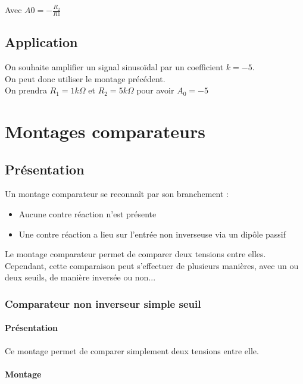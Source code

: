 Avec $A0= -\frac{R_2}{R1}$

\section{Application}

\begin{exemple}
On souhaite amplifier un signal sinusoïdal par un coefficient $k=-5$.\\
On peut donc utiliser le montage précédent. \\
On prendra $R_1=1 k\Omega$ et $R_2=5k\Omega$ pour avoir $A_0=-5$

\end{exemple}


\chapter{Montages comparateurs}
\section{Présentation}

Un montage comparateur se reconnaît par son branchement : 

\begin{itemize}
  \item {\color{red}Aucune contre réaction} n’est présente
  \item Une {\color{red} contre réaction a lieu sur l’entrée non inverseuse} via un dipôle passif
\end{itemize}

Le montage comparateur permet de comparer deux tensions entre elles. \\
Cependant, cette comparaison peut s’effectuer de plusieurs manières, avec un ou deux seuils, de manière inversée ou non...

\subsection{Comparateur non inverseur simple seuil}

\subsubsection{Présentation}

Ce montage permet de comparer simplement deux tensions entre elle.

\subsubsection{Montage}

